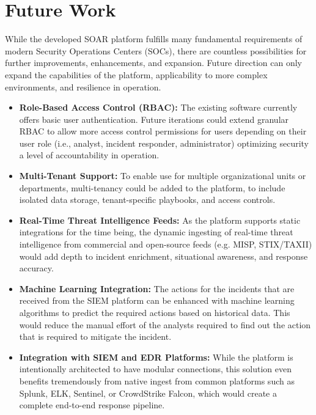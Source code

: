 \section{Future Work}

While the developed SOAR platform fulfills many fundamental requirements of modern Security Operations Centers (SOCs), there are countless possibilities for further improvements, enhancements, and expansion. Future direction can only expand the capabilities of the platform, applicability to more complex environments, and resilience in operation.

\begin{itemize}
    \item \textbf{Role-Based Access Control (RBAC):} The existing software currently offers basic user authentication. Future iterations could extend granular RBAC to allow more access control permissions for users depending on their user role (i.e., analyst, incident responder, administrator) optimizing security a level of accountability in operation.
    
    \item \textbf{Multi-Tenant Support:} To enable use for multiple organizational units or departments, multi-tenancy could be added to the platform, to include isolated data storage, tenant-specific playbooks, and access controls.

    \item \textbf{Real-Time Threat Intelligence Feeds:} As the platform supports static integrations for the time being, the dynamic ingesting of real-time threat intelligence from commercial and open-source feeds (e.g. MISP, STIX/TAXII) would add depth to incident enrichment, situational awareness, and response accuracy.

    \item \textbf{Machine Learning Integration:} The actions for the incidents that are received from the SIEM platform can be enhanced with machine learning algorithms to predict the required actions based on historical data. This would reduce the manual effort of the analysts required to find out the action that is required to mitigate the incident.

    \item \textbf{Integration with SIEM and EDR Platforms:} While the platform is intentionally architected to have modular connections, this solution even benefits tremendously from native ingest from common platforms such as Splunk, ELK, Sentinel, or CrowdStrike Falcon, which would create a complete end-to-end response pipeline.


\end{itemize}
